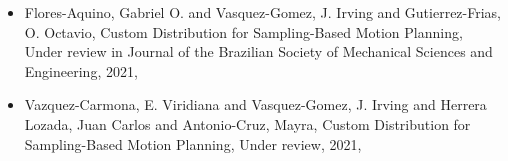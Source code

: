 \begin{itemize} 
\item Flores-Aquino, Gabriel O. and Vasquez-Gomez, J. Irving and Gutierrez-Frias, O. Octavio, Custom Distribution for Sampling-Based Motion Planning, Under review in Journal of the Brazilian Society of Mechanical Sciences and Engineering, 2021, \href{https://arxiv.org/abs/2104.10292}{\faFilePdfO} 
\item Vazquez-Carmona, E. Viridiana and Vasquez-Gomez, J. Irving and Herrera Lozada, Juan Carlos and Antonio-Cruz, Mayra, Custom Distribution for Sampling-Based Motion Planning, Under review, 2021, \href{https://arxiv.org/abs/2105.08743}{\faFilePdfO} 
\end{itemize} 
